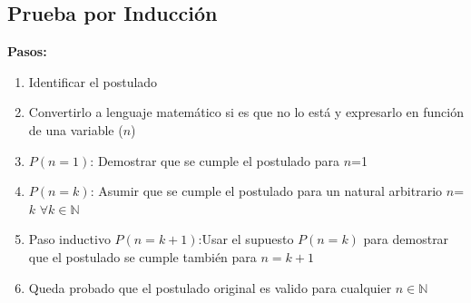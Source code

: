 \documentclass[spanish,12pt]{article}
\newcommand{\N}{\mathbb{N}}
\begin{document}
\subsection{Prueba por Inducción}
\textbf{Pasos:}
\begin{enumerate}
    \item Identificar el postulado
    \item Convertirlo a lenguaje matemático si es que no lo está y expresarlo en función de una variable ($n$)
    \item $P(n=1)$: Demostrar que se cumple el postulado para $n$=1
    \item $P(n=k)$: Asumir que se cumple el postulado para un natural arbitrario $n$=$k$ $\forall k\in\N$
    \item Paso inductivo $P(n=k+1)$:Usar el supuesto $P(n=k)$ para demostrar que el postulado se cumple también para $n=k+1$
    \item Queda probado que el postulado original es valido para cualquier $n\in\N$
\end{enumerate}
\end{document}
